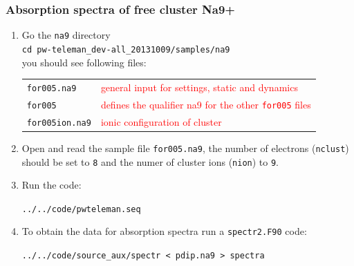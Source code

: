 \documentclass[10pt]{beamer}
\begin{document}

\begin{frame}
\frametitle{Absorption spectra of free cluster Na9+}
\begin{enumerate}
\item Go the {\tt na9} directory\\
\vspace*{0.2cm}
{\tt cd pw-teleman\_dev-all\_20131009/samples/na9}\\
\vspace*{0.2cm}
you should see following files:\\
\vspace*{0.2cm}
\begin{tabular}{ll}
{\tt for005.na9} &{\scriptsize{\textcolor{red}{general input for settings, static and dynamics}}}\\
{\tt for005}  &{\scriptsize{\textcolor{red}{defines the qualifier na9 for the other {\tt for005} files}}}\\
{\tt for005ion.na9}  &{\scriptsize{\textcolor{red}{ionic configuration of cluster}}}\\
\end{tabular}
\vspace*{0.4cm}


\item Open and read the sample file {\tt for005.na9}, the number of electrons ({\tt nclust}) should be set to {\tt 8} and the numer of cluster ions ({\tt nion}) to {\tt 9}. 

\item Run the code:

{\tt ../../code/pwteleman.seq}

\item To obtain the data for absorption spectra run a {\tt spectr2.F90} code:

\small{{\tt ../../code/source\_aux/spectr < pdip.na9 > spectra}}
\end{enumerate}

\end{frame}
\end{document}
